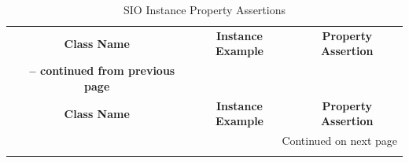 \begin{center}
\begin{longtable}{|c||c||c|}
\caption{SIO Instance Property Assertions} \label{tab:app-ipa} \\

\hline \multicolumn{1}{|c||}{\textbf{Class Name}} & \multicolumn{1}{c||}{\textbf{Instance Example}} & \multicolumn{1}{c|}{\textbf{Property Assertion}} \\ \hhline{|=#=#=|}
\endfirsthead

\multicolumn{3}{c}%
{{\bfseries \tablename\ \thetable{} -- continued from previous page}} \\
\hline \multicolumn{1}{|c||}{\textbf{Class Name}} &
\multicolumn{1}{c||}{\textbf{Instance Example}} &
\multicolumn{1}{c|}{\textbf{Property Assertion}} \\ \hline 
\endhead

\hline \multicolumn{3}{|r|}{{Continued on next page}} \\ \hline
\endfoot


\end{longtable}
\end{center}
